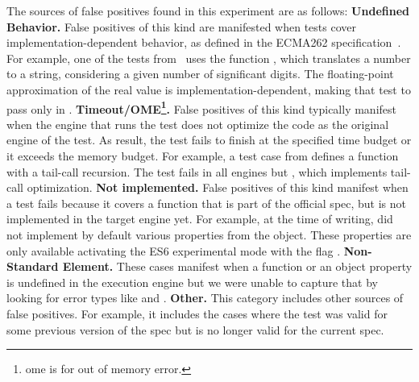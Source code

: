 \documentclass[smallextended]{svjour3}
\begin{document}

\sloppy The sources of false positives found in this experiment are as
follows: \textbf{Undefined Behavior.} False positives of this kind are
manifested when tests cover implementation-dependent behavior, as
defined in the ECMA262 specification~\cite{ecmas262-spec}. For
example, one of the tests from \jerry\ uses the function
, which translates a number to
a string, considering a given number of significant digits. The
floating-point approximation of the real value is
implementation-dependent, making that test to pass only in
\chakra. \textbf{Timeout/OME\footnote{ome is for out of memory
    error.}.} False positives of this kind typically manifest when the
engine that runs the test does not optimize the code as the original
engine of the test. As result, the test fails to finish at the
specified time budget or it exceeds the memory budget. For example, a
test case from \jsc defines a function with a tail-call
recursion. The test fails in all engines but \jsc, which implements
tail-call optimization. \textbf{Not implemented.} False positives of
this kind manifest when a test fails because it covers a function that
is part of the official spec, but is not implemented in the target
engine yet. For example, at the time of writing, \chakra{} did not
implement by default various properties from the 
object. These properties are only available activating the ES6
experimental mode with the flag .
\textbf{Non-Standard Element.} These cases manifest when a function or
an object property is undefined in the execution engine but we were
unable to capture that by looking for error types like
 and .  \textbf{Other.} This category
includes other sources of false positives. For example, it includes
the cases where the test was valid for some previous version of the
spec but is no longer valid for the current spec.
\end{document}
